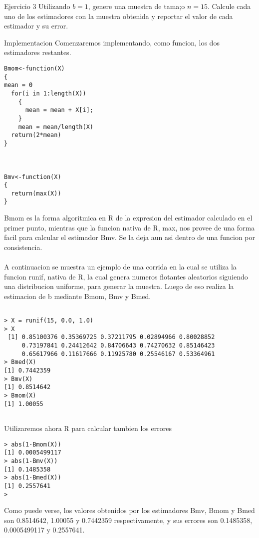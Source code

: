 



\begin{section}{Ejercicio 3}
Utilizando $b = 1$, genere una muestra de tama;o $n = 15$. Calcule cada uno de los estimadores con la muestra obtenida y reportar el valor de cada estimador y su error.

\begin{subsection}{Implementacion}
Comenzaremos implementando, como funcion, los dos estimadores restantes.


\begin{verbatim}
Bmom<-function(X)
{
mean = 0
  for(i in 1:length(X))
    { 
      mean = mean + X[i];
    }
    mean = mean/length(X)
  return(2*mean)
}



Bmv<-function(X)
{
  return(max(X))
}
\end{verbatim}


Bmom es la forma algoritmica en R de la expresion del estimador calculado en el primer punto, mientras que la funcion nativa de R, max, nos provee de una forma facil para calcular el estimador Bmv. Se la deja aun asi dentro de una funcion por consistencia.\\
\\
A continuacion se muestra un ejemplo de una corrida en la cual se utiliza la funcion runif, nativa de R, la cual genera numeros flotantes aleatorios siguiendo una distribucion uniforme, para generar la muestra. Luego de eso realiza  la estimacion de b mediante Bmom, Bmv y Bmed.


\begin{verbatim}

> X = runif(15, 0.0, 1.0)
> X
 [1] 0.85100376 0.35369725 0.37211795 0.02894966 0.80028852
     0.73197841 0.24412642 0.84706643 0.74270632 0.85146423
     0.65617966 0.11617666 0.11925780 0.25546167 0.53364961
> Bmed(X)
[1] 0.7442359
> Bmv(X)
[1] 0.8514642
> Bmom(X)
[1] 1.00055


\end{verbatim}

Utilizaremos ahora R para calcular tambien los errores

\begin{verbatim}
> abs(1-Bmom(X))
[1] 0.0005499117
> abs(1-Bmv(X))
[1] 0.1485358
> abs(1-Bmed(X))
[1] 0.2557641
> 
\end{verbatim}

Como puede verse, los valores obtenidos por los estimadores Bmv, Bmom y Bmed son 0.8514642, 1.00055 y 0.7442359 respectivamente, y sus errores son 0.1485358, 0.0005499117 y 0.2557641.


\end{subsection}
\end{section}